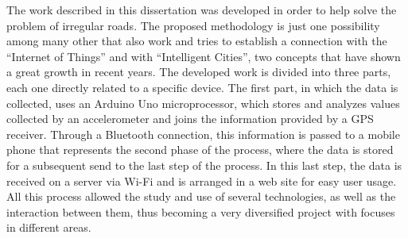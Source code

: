 The work described in this dissertation was developed in order to help solve the problem of irregular roads.
The proposed methodology is just one possibility among many other that also work and tries to establish a connection with the ``Internet of Things'' and with ``Intelligent Cities'', two concepts that have shown a great growth in recent years.
The developed work is divided into three parts, each one directly related to a specific device.
The first part, in which the data is collected, uses an Arduino Uno microprocessor, which stores and analyzes values collected by an accelerometer and joins the information provided by a GPS receiver.
Through a Bluetooth connection, this information is passed to a mobile phone that represents the second phase of the process, where the data is stored for a subsequent send to the last step of the process.
In this last step, the data is received on a server via Wi-Fi and is arranged in a web site for easy user usage.
All this process allowed the study and use of several technologies, as well as the interaction between them, thus becoming a very diversified project with focuses in different areas.